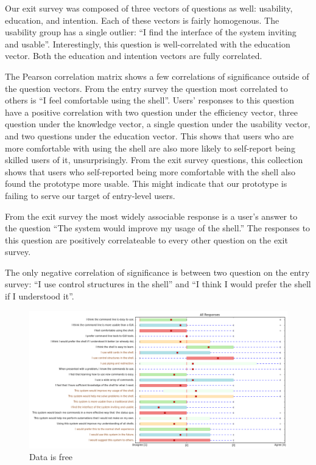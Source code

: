 Our exit survey was composed of three vectors of questions as well: usability,
education, and intention. Each of these vectors is fairly homogenous. The
usability group has a single outlier: ``I find the interface of the system
inviting and usable''. Interestingly, this question is well-correlated with the
education vector. Both the education and intention vectors are fully correlated.

The Pearson correlation matrix shows a few correlations of significance outside
of the question vectors.  From the entry survey the question most correlated to
others is ``I feel comfortable using the shell''. Users' responses to this question
have a positive correlation with two question under the efficiency vector, three
question under the knowledge vector, a single question under the usability
vector, and two questions under the education vector. This shows that users who
are more comfortable with using the shell are also more likely to self-report
being skilled users of it, unsurprisingly. From the exit survey questions, this
collection shows that users who self-reported being more comfortable with the
shell also found the prototype more usable. This might indicate that our
prototype is failing to serve our target of entry-level users.

From the exit survey the most widely associable response is a user's answer to
the question ``The system would improve my usage of the shell.'' The responses to
this question are positively correlateable to every other question on the exit
survey.

The only negative correlation of significance is between two question on the
entry survey: ``I use control structures in the shell'' and ``I think I would
prefer the shell if I understood it''.

\begin{figure}[H]
  \centering
\label{fig:alldata}
  \includegraphics[width=\textwidth]{figures/stats/all.png}
  \caption{Data is free}
\end{figure}

